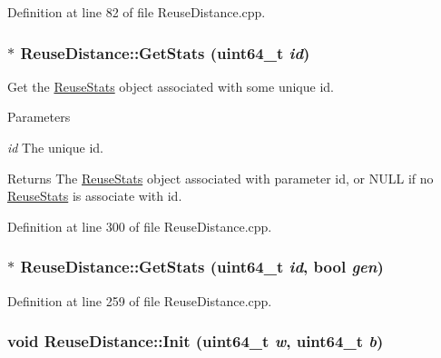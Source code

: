 Definition at line 82 of file ReuseDistance.cpp.

\hypertarget{class_reuse_distance_a771580c25dc5140969919e959e2ebdd1}{
\subsubsection[{GetStats}]{ $\ast$ ReuseDistance::GetStats (uint64\_\-t {\em id})}}
\label{class_reuse_distance_a771580c25dc5140969919e959e2ebdd1}
Get the \hyperlink{class_reuse_stats}{ReuseStats} object associated with some unique id.


\begin{DoxyParams}{Parameters}
\item[{\em id}]The unique id.\end{DoxyParams}
\begin{DoxyReturn}{Returns}
The \hyperlink{class_reuse_stats}{ReuseStats} object associated with parameter id, or NULL if no \hyperlink{class_reuse_stats}{ReuseStats} is associate with id. 
\end{DoxyReturn}


Definition at line 300 of file ReuseDistance.cpp.

\hypertarget{class_reuse_distance_adb13097f908e002f1da8e188d7dc3210}{
\subsubsection[{GetStats}]{ $\ast$ ReuseDistance::GetStats (uint64\_\-t {\em id}, \/  bool {\em gen})}}
\label{class_reuse_distance_adb13097f908e002f1da8e188d7dc3210}


Definition at line 259 of file ReuseDistance.cpp.

\hypertarget{class_reuse_distance_a265c98b7a9460b3312ea5c78dae968cc}{
\subsubsection[{Init}]{\setlength{\rightskip}{0pt plus 5cm}void ReuseDistance::Init (uint64\_\-t {\em w}, \/  uint64\_\-t {\em b})}}
\label{class_reuse_distance_a265c98b7a9460b3312ea5c78dae968cc}


